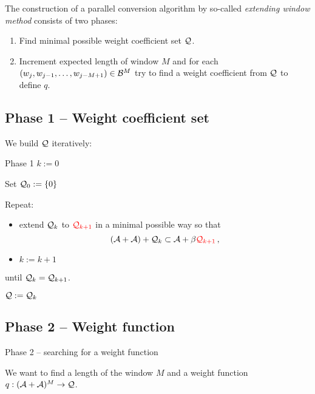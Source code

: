 The construction of a parallel conversion algorithm by so-called \emph{extending window method} consists of two phases:
    \begin{enumerate}
        \item Find minimal possible weight coefficient set $\mathcal{Q}$.
        \item Increment expected length of window $M$ and for each $(w_j,w_{j-1}, \dots , w_{j-M+1}) \in \mathcal{B}^{M}$ try to find a weight coefficient from $\mathcal{Q}$ to define $q$.
    \end{enumerate}
    
\subsection{Phase 1 -- Weight coefficient set}

    We build $\mathcal{Q}$ iteratively:
    
    
    {Phase 1}
     $k:=0$
     
      Set $\mathcal{Q}_0:=\{0\}$
      
      
      Repeat:
      \begin{itemize}
          \item extend $\mathcal{Q}_k$ to $\textcolor{red}{\mathcal{Q}_{k+1}}$ in a minimal possible way so that
           $$
              (\mathcal{A}+\mathcal{A})+ \mathcal{Q}_k \subset \mathcal{A} + \beta \textcolor{red}{\mathcal{Q}_{k+1}}\,,
           $$
           \item $k:=k+1$
      \end{itemize}
      
      until $\mathcal{Q}_k = \mathcal{Q}_{k+1}$.
      
      
      \vspace{7pt}
      $\mathcal{Q}:=\mathcal{Q}_k$
    





\subsection{Phase 2 -- Weight function}

    {Phase 2 -- searching for a weight function}

    We want to find a length of the window $M$ and a weight function $q:(\mathcal{A}+\mathcal{A})^{M} \to \mathcal{Q}$.%
    
